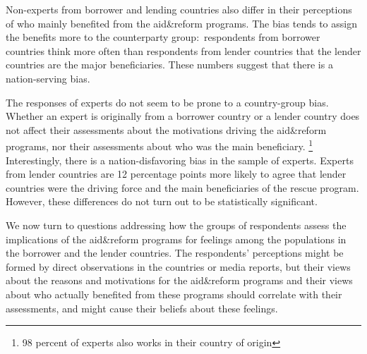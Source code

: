Non-experts from borrower and lending countries also differ in
their perceptions of who mainly benefited from the aid\&reform programs. The
bias tends to assign the benefits more to the counterparty group:\
respondents from borrower countries think more often than respondents from
lender countries that the lender countries are the major beneficiaries. These numbers
suggest that there is a nation-serving bias. 

The responses of experts do not seem to be prone to a country-group
bias. Whether an expert is originally from a borrower country or a lender
country does not affect their assessments about the
motivations driving the aid\&reform programs, nor their assessments about
who was the main beneficiary. \footnote{98 percent of experts also works in their country of origin }  Interestingly, there is a nation-disfavoring bias in the sample of experts. Experts from lender countries are 12 percentage points more likely to agree that lender countries were the driving force and the main beneficiaries of the rescue program. However, these differences do not turn out to be statistically significant.

We now turn to questions addressing how the groups of respondents
assess the implications of the aid\&reform programs for feelings among the
populations in the borrower and the lender
countries. The respondents' perceptions might be formed by direct
observations in the countries or media reports, but their views about the
reasons and motivations for the aid\&reform programs and their views about
who actually benefited from these programs should correlate with their
assessments, and might cause their beliefs about these feelings. 

